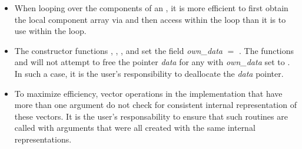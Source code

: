 \begin{itemize}
                                        
\item
  When looping over the components of an  , it is     
  more efficient to first obtain the local component array via       
   and then access  within the     
  loop than it is to use  within the loop.        
                                                               
\item
  The {\nvecp} constructor functions , , 
  , and 
  set the field {\em own\_data} $=$ . 
  The functions  and 
  will not attempt to free the pointer {\em data} for any  with
  {\em own\_data} set to . In such a case, it is the user's responsibility to
  deallocate the {\em data} pointer.

\item
  To maximize efficiency, vector operations in the {\nvecp} implementation
  that have more than one  argument do not check for
  consistent internal representation of these vectors. It is the user's 
  responsability to ensure that such routines are called with 
  arguments that were all created with the same internal representations.

\end{itemize}

